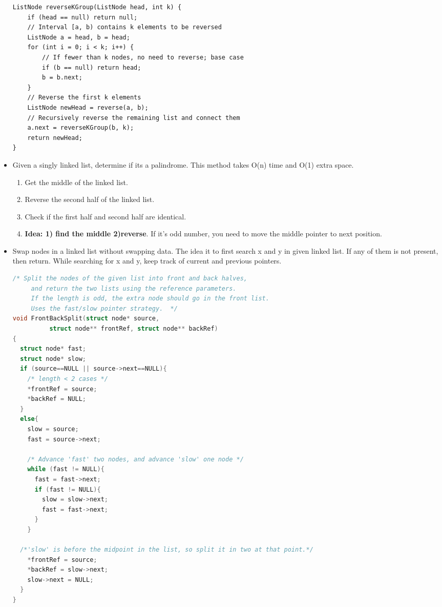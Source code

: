\documentclass[a4paper,11pt,twoside]{book}
\begin{document}
\begin{itemize}
\begin{lstlisting}
ListNode reverseKGroup(ListNode head, int k) {
	if (head == null) return null;
	// Interval [a, b) contains k elements to be reversed
	ListNode a = head, b = head;
	for (int i = 0; i < k; i++) {
		// If fewer than k nodes, no need to reverse; base case
		if (b == null) return head;
		b = b.next;
	}
	// Reverse the first k elements
	ListNode newHead = reverse(a, b);
	// Recursively reverse the remaining list and connect them
	a.next = reverseKGroup(b, k);
	return newHead;
}
\end{lstlisting}

	\item Given a singly linked list, determine if its a palindrome. This method takes O(n) time and O(1) extra space.
\begin{enumerate}
	\item Get the middle of the linked list.
	\item Reverse the second half of the linked list.
	\item Check if the first half and second half are identical.
	\item \textbf{Idea: 1) find the middle 2)reverse}. If it's odd number,  you need to move the middle pointer to next position.
\end{enumerate}


	\item Swap nodes in a linked list without swapping data. The idea it to first search x and y in given linked list. If any of them is not present, then return. While searching for x and y, keep track of current and previous pointers.
\begin{lstlisting}[frame=single, language=c++] 
/* Split the nodes of the given list into front and back halves,
     and return the two lists using the reference parameters.
     If the length is odd, the extra node should go in the front list.
     Uses the fast/slow pointer strategy.  */
void FrontBackSplit(struct node* source,
          struct node** frontRef, struct node** backRef)
{
  struct node* fast;
  struct node* slow;
  if (source==NULL || source->next==NULL){
    /* length < 2 cases */
    *frontRef = source;
    *backRef = NULL;
  }
  else{
    slow = source;
    fast = source->next;
 
    /* Advance 'fast' two nodes, and advance 'slow' one node */
    while (fast != NULL){
      fast = fast->next;
      if (fast != NULL){
        slow = slow->next;
        fast = fast->next;
      }
    }
 
  /*'slow' is before the midpoint in the list, so split it in two at that point.*/
    *frontRef = source;
    *backRef = slow->next;
    slow->next = NULL;
  }
}


\end{lstlisting}
\end{itemize}
\end{document}
